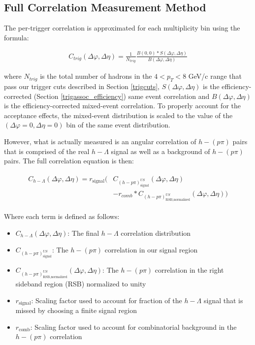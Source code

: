 \documentclass[ALICE,manyauthors]{ALICE_analysis_notes}
\begin{document}
\subsection{Full Correlation Measurement Method}

The per-trigger correlation is approximated for each multiplicity bin using the formula:

\begin{align}
\label{corrEq}
C_{trig}(\Delta\varphi, \Delta\eta) = \frac{1}{N_{trig}}\frac{B(0,0)*S(\Delta\varphi,\Delta\eta)}{B(\Delta\varphi, \Delta\eta)}
\end{align}

where $N_{trig}$ is the total number of hadrons in the $4 < p_{T} < 8$ GeV/c range that pass our trigger cuts described in Section \ref{trigcuts}, $S(\Delta\varphi, \Delta\eta)$ is the efficiency-corrected (Section \ref{trigassoc_efficiency}) same event correlation and $B(\Delta\varphi, \Delta\eta)$ is the efficiency-corrected mixed-event correlation.  To properly account for the acceptance effects, the mixed-event distribution is scaled to the value of the $(\Delta\varphi = 0, \Delta\eta = 0)$ bin of the same event distribution.

However, what is actually measured is an angular correlation of $h-(p\pi)$ pairs that is comprised of the real $h-\Lambda$ signal as well as a background of $h-(p\pi)$ pairs. The full correlation equation is then:

\begin{align}
\label{corrEq_withBG}
\begin{split}
    C_{h-\Lambda}(\Delta\varphi, \Delta\eta) = r_{\text{signal}}\biggl(&C_{(h-p\pi)^{US}_{\text{signal}}}(\Delta\varphi, \Delta\eta)\\
    &- r_{comb}*C_{(h-p\pi)^{US}_{\text{RSB,normalized}}}(\Delta\varphi, \Delta\eta)\biggr)
\end{split}
\end{align}

Where each term is defined as follows:
\begin{itemize}
	\item $C_{h-\Lambda}(\Delta\varphi, \Delta\eta)$: The final $h-\Lambda$ correlation distribution
	\item $C_{(h-p\pi)^{US}_{\text{signal}}}$: The $h-(p\pi)$ correlation in our signal region
	\item $C_{(h-p\pi)^{US}_{\text{RSB,normalized}}}(\Delta\varphi, \Delta\eta)$: The $h-(p\pi)$ correlation in the right sideband region (RSB) normalized to unity
	\item $r_{\text{signal}}$: Scaling factor used to account for fraction of the $h-\Lambda$ signal that is missed by choosing a finite signal region
	\item $r_{\text{comb}}$: Scaling factor used to account for combinatorial background in the $h-(p\pi)$ correlation
\end{itemize}
\end{document}

